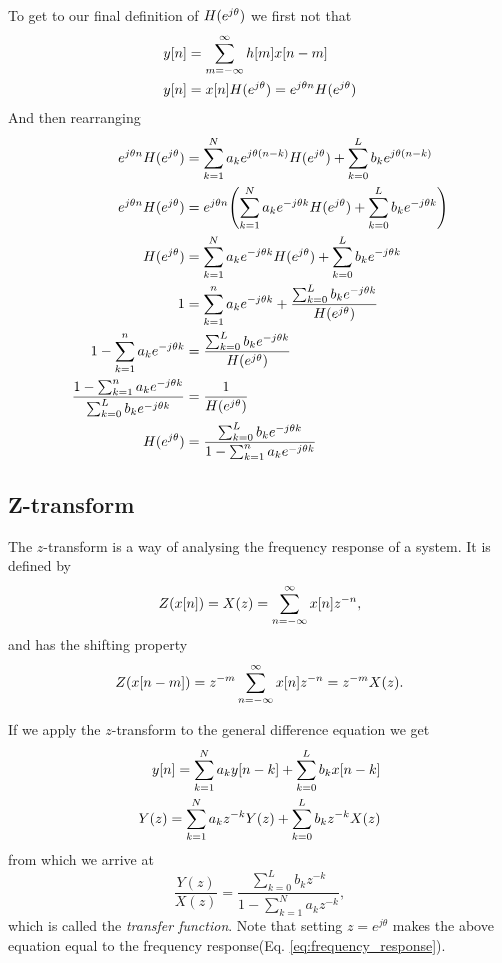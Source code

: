 \documentclass[11pt]{article}
\let\originalleft\left
\let\originalright\right
\renewcommand{\left}{\mathopen{}\mathclose\bgroup\originalleft}
\renewcommand{\right}{\aftergroup\egroup\originalright}
\def\lsqb{\left[}
\def\rsqb{\right]}
\def\sqb#1{\lsqb #1 \rsqb}
\def\xsig{x\sqb{n}}
\def\ysig{y\sqb{n}}
\begin{document}
To get to our final definition of $H(e^{j\theta})$ we first not that
\begin{align}
    \ysig &= \convsum h\sqb{m} x\sqb{n-m} \\
    \ysig &= \xsig \hfun = e^{j\theta n} \hfun
\end{align}
And then rearranging
\begin{align}
    e^{j\theta n} \hfun &= \sum_{k=1}^{N} a_k e^{j\theta (n-k)} \hfun + \sum_{k=0}^{L} b_k e^{j\theta(n-k)} \\
    e^{j\theta n} \hfun &= e^{j\theta n} \left( \sum_{k=1}^{N} a_k e^{-j\theta k} \hfun + \sum_{k=0}^{L} b_k e^{-j\theta k} \right)\\
    \hfun &= \sum_{k=1}^{N} a_k e^{-j\theta k} \hfun + \sum_{k=0}^{L} b_k e^{-j\theta k} \\
    1 &= \sum_{k=1}^{n} a_k e^{-j\theta k} + \frac{\sum_{k=0}^{L} b_k e^{-j\theta k}}{\hfun} \\
    1 - \sum_{k=1}^{n} a_k e^{-j\theta k} &= \frac{\sum_{k=0}^{L} b_k e^{-j\theta k}}{\hfun} \\
    \frac{1 - \sum_{k=1}^{n} a_k e^{-j\theta k}}{\sum_{k=0}^{L} b_k e^{-j\theta k}} &= \frac{1}{\hfun}\\
    \hfun &= \frac{\sum_{k=0}^{L} b_k e^{-j\theta k}}{1 - \sum_{k=1}^{n} a_k e^{-j\theta k}} \label{eq:frequency_response}
\end{align}

\subsection{Z-transform}
The $z$-transform is a way of analysing the frequency response of a system. It is defined by
\begin{equation}
    Z(\xsig) = X(z) = \sum_{n=-\infty}^{\infty} \xsig z^{-n},
\end{equation}
and has the shifting property
\begin{equation}
    Z(x\sqb{n-m}) = z^{-m} \sum_{n=-\infty}^{\infty} x\sqb{n} z^{-n} = z^{-m} X(z).
\end{equation}

If we apply the $z$-transform to the general difference equation we get
\begin{align}
    \ysig = \sum_{k=1}^N a_k y\sqb{n-k} + \sum_{k=0}^L b_k x\sqb{n-k} \\
    Y(z) = \sum_{k=1}^N a_k z^{-k} Y(z) + \sum_{k=0}^L b_k z^{-k} X(z) \\
\end{align}
from which we arrive at
\begin{equation}
    \label{eq:ztransform}
    \frac{Y(z)}{X(z)} = \frac{\sum_{k=0}^L b_k z^{-k}}{1 - \sum_{k=1}^N a_k z^{-k}},
\end{equation}
which is called the \textit{transfer function}. Note that setting $z = e^{j\theta}$ makes the above equation equal to the frequency response(Eq. \ref{eq:frequency_response}).
\end{document}
